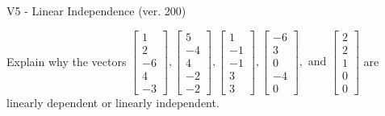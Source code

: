 \begin{exercise}
  \begin{exerciseTitle}V5 - Linear Independence (ver. 200)\end{exerciseTitle}
  \begin{exerciseStatement}
    Explain why the vectors \(\left[\begin{array}{r}
1 \\
2 \\
-6 \\
4 \\
-3
\end{array}\right] , \left[\begin{array}{r}
5 \\
-4 \\
4 \\
-2 \\
-2
\end{array}\right] , \left[\begin{array}{r}
1 \\
-1 \\
-1 \\
3 \\
3
\end{array}\right] , \left[\begin{array}{r}
-6 \\
3 \\
0 \\
-4 \\
0
\end{array}\right] , \text{ and } \left[\begin{array}{r}
2 \\
2 \\
1 \\
0 \\
0
\end{array}\right]\) are linearly dependent or linearly independent.	



\end{exerciseStatement}
\end{exercise}
